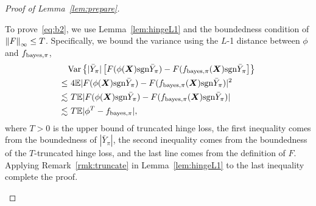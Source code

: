 \documentclass[11pt]{article}
\theoremstyle{plain}
\theoremstyle{definition}
\def\sign{\textup{sgn}}
\def\bayespif{f_{\textup{bayes},\pi}}
\def\shift{\bar Y_\pi}
\begin{document}
\begin{proof}[Proof of Lemma~\ref{lem:prepare}]
\begin{enumerate}[label={2.\arabic*},wide, labelwidth=!, labelindent=0pt]
To prove~\eqref{eq:b2}, we use Lemma~\ref{lem:hingeL1} and the boundedness condition of $\left\lVert F\right\rVert_\infty\leq T$. Specifically, we bound the variance using the $L$-1 distance between $\phi$ and $\bayespif$, 
\begin{align}
&\text{Var}\left\{|\shift|\left[F(\phi(\mX)\sign \shift)-F(\bayespif(\mX)\sign \shift\right]\right\}\\
\leq&\ 4 \mathbb{E}|F(\phi(\mX)\sign \shift)-F(\bayespif(\mX)\sign \shift)|^2\\
\lesssim &\ T\mathbb{E}|F(\phi(\mX)\sign \shift)-F(\bayespif(\mX)\sign \shift)|\\
\lesssim &\ T\mathbb{E}|\phi^T-\bayespif|,
\end{align}
where $T>0$ is the upper bound of truncated hinge loss, the first inequality comes from the boundedness of $|\shift|$, the second inequality comes from the boundedness of the $T$-truncated hinge loss, and the last line comes from the definition of $F$. Applying Remark~\ref{rmk:truncate} in Lemma~\ref{lem:hingeL1} to the last inequality complete the proof.
\end{enumerate}
\end{proof}
\end{document}
